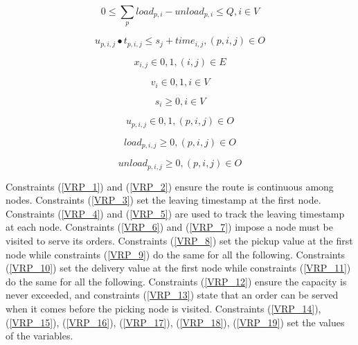 \begin{equation}
0\le\sum_{p}{load_{p,i}-unload_{p,i}\le Q}, i\in V
\label{VRP_12}
\end{equation}

\begin{equation}
u_{p,i,j}\bullet t_{p,i,j}\le s_j+time_{i,j}, \left(p,i,j\right)\in O
\label{VRP_13}
\end{equation}

\begin{equation}
x_{i,j}\in{0,1}, \left(i,j\right)\in E
\label{VRP_14}
\end{equation}

\begin{equation}
v_i\in{0,1}, i\in V
\label{VRP_15}
\end{equation}

\begin{equation}
s_i\geq0, i\in V
\label{VRP_16}
\end{equation}

\begin{equation}
u_{p,i,j}\in{0,1}, (p,i,j)\in O
\label{VRP_17}
\end{equation}

\begin{equation}
{load}_{p,i,j}\geq0, (p,i,j)\in O
\label{VRP_18}
\end{equation}

\begin{equation}
{unload}_{p,i,j}\geq0, (p,i,j)\in O
\label{VRP_19}
\end{equation}

Constraints (\ref{VRP_1}) and (\ref{VRP_2}) ensure the route is continuous among nodes. Constraints (\ref{VRP_3}) set the leaving timestamp at the first node. Constraints (\ref{VRP_4}) and (\ref{VRP_5}) are used to track the leaving timestamp at each node. Constraints (\ref{VRP_6}) and (\ref{VRP_7}) impose a node must be visited to serve its orders. Constraints (\ref{VRP_8}) set the pickup value at the first node while constraints (\ref{VRP_9}) do the same for all the following. Constraints (\ref{VRP_10}) set the delivery value at the first node while constraints (\ref{VRP_11}) do the same for all the following. Constraints (\ref{VRP_12}) ensure the capacity is never exceeded, and constraints (\ref{VRP_13}) state that an order can be served when it comes before the picking node is visited. Constraints (\ref{VRP_14}), (\ref{VRP_15}), (\ref{VRP_16}), (\ref{VRP_17}), (\ref{VRP_18}), (\ref{VRP_19}) set the values of the variables.\par

